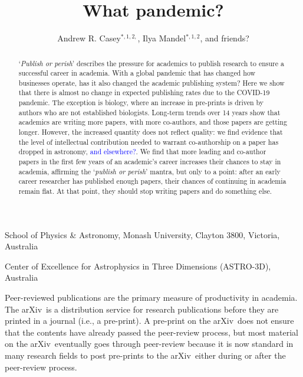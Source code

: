\documentclass{nature}
\title{What pandemic?}
\author{Andrew R. Casey$^{\ast,1,2,}$,
        Ilya Mandel$^{\ast,1,2}$,
        and friends?
}
\newcommand{\todo}[1]{\textcolor{blue}{#1}}
\newcommand{\arxiv}{arXiv}
\begin{document}
\maketitle

\begin{affiliations}
	\item School of Physics \& Astronomy, Monash University, Clayton 3800, Victoria, Australia
	\item Center of Excellence for Astrophysics in Three Dimensions (ASTRO-3D), Australia
\end{affiliations}

\begin{abstract}
	`\emph{Publish or perish}' describes the pressure for academics to publish research to ensure a successful career in academia.
	With a global pandemic that has changed how businesses operate, has it also changed the academic publishing system?
	Here we show that there is almost no change in expected publishing rates due to the COVID-19 pandemic.
	The exception is biology, where an increase in pre-prints is driven by authors who are not established biologists.
	Long-term trends over 14 years show that academics are writing more papers, with more co-authors, and those papers are getting longer. 
	However, the increased quantity does not reflect quality: we find evidence that the level of intellectual contribution needed to warrant co-authorship on a paper has dropped in astronomy, \todo{and elsewhere?}. 
	We find that more leading and co-author papers in the first few years of an academic's career increases their chances to stay in academia, affirming the `\emph{publish or perish}' mantra, but only to a point: after an early career researcher has published enough papers, their chances of continuing in academia remain flat. At that point, they should stop writing papers and do something else.
\end{abstract}


Peer-reviewed publications are the primary measure of productivity in academia. The \arxiv\ is a distribution service for research publications before they are printed in a journal (i.e., a pre-print). A pre-print on the \arxiv\ does not ensure that the contents have already passed the peer-review process, but most material on the \arxiv\ eventually goes through peer-review because it is now standard in many research fields to post pre-prints to the \arxiv\ either during or after the peer-review process.
\end{document}

